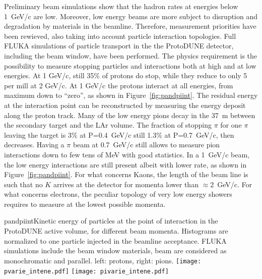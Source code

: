 Preliminary beam simulations show that the hadron rates at 
energies below 1~GeV/c are low. Moreover, low energy beams are more
subject to disruption and degradation by materials in the
beamline. Therefore, measurement priorities  have been rewieved, also taking
into account particle interaction topologies.  Full FLUKA\cite{fluka05,Fluka15}
 simulations
of particle transport in the the ProtoDUNE detector, including the
beam window, have been performed.
 The physics requirement is the possibility to measure
 stopping particles and  interactions both at high and at low energies.    
At 1 GeV/c, still 35\% of protons do stop, while they reduce to only 5
per mill at 2 GeV/c.  At  1 GeV/c  the protons interact at all
energies, from maximum down to “zero”, as shown in
Figure~\ref{fig:pandpiint}. The residual energy at the interaction
point can be reconstructed by measuring the energy deposit along the proton track.
Many of the  low energy pions decay in the 37~m between the secondary target
and the LAr volume.  The fraction of stopping $\pi$ for one $\pi$
leaving the target is 3\% at P=0.4~GeV/c still  1.3\% at P=0.7~GeV/c,
then decreases.  Having a $\pi$ beam at 0.7~GeV/c still allows to
measure pion interactions down to few tens of MeV with good
statistics. In a 1~GeV/c beam, the low energy interactions are still
present albeit with lower rate, as shown in Figure~\ref{fig:pandpiint}.
For what concerns Kaons, the length of the beam line is such that no
$K$ arrives at the detector for momenta lower than $\approx$2~GeV/c.
For what concerns electrons, the peculiar topology of very low energy
showers requires to measure at the lowest possible momenta.
\begin{cdrfigure}{pandpiint}{Kinetic energy of
    particles at the point of interaction in the ProtoDUNE active
    volume, for different beam momenta. Histograms are normalized to one particle injected in the
    beamline acceptance. FLUKA simulations include the beam window
    materials, beam are considered as monochromatic and
    parallel. left: protons, right: pions.}
  \texttt{[image: pvarie\_intene.pdf]}
  \texttt{[image: pivarie\_intene.pdf]}
\end{cdrfigure}


